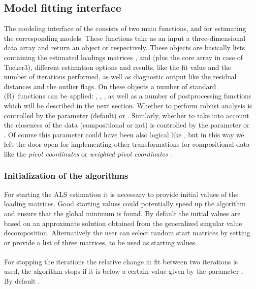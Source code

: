 \documentclass[article,shortnames, nojss]{jss}
\begin{document}
\subsection{Model fitting interface}
\label{sec:interface}
The modeling interface of the  consists of two main
functions,  and  for estimating
the corresponding models. These functions take as an input a three-dimensional
data array and return an  object  or 
respectively. These objects are basically lists containing the estimated
loadings matrices ,  and  (plus the core
array  in case of Tucker3), different estimation options and
results, like the fit value and the number of iterations performed,
as well as diagnostic output like the residual distances and the outlier flags.
On these objects a number of standard \proglang(R)~functions can be applied: ,
, ,  as well as a number of
postprocessing functions which will be described in the next section.
Whether to perform robust analysis is controlled by  the parameter
 (default) or . Similarly, whether
to take into account the closeness of the data (compositional or not) is
controlled by the parameter  or .
Of course this parameter could have been also logical like ,
but in this way we left the door open for implementing other transformations for
compositional data like the \emph{pivot coordinates} or \emph{weighted pivot coordinates}
\citep[see][]{filzmoser-book:2018}.
\subsubsection{Initialization of the algorithms}
For starting the ALS estimation it is necessary to provide
initial values of the loading matrices. Good starting values
could potentially  speed up the algorithm and ensure that the
global minimum  is found. By default the initial values are based on
an approximate solution obtained from the generalized
singular value decomposition. Alternatively the user
can select random start matrices by setting  or
provide a list of three matrices, to be used as starting values.\\\\
For stopping the iterations the  relative  change in fit between
two iterations is used, the algorithm stops if it is
below a certain value given by the parameter .
By default .
\end{document}
